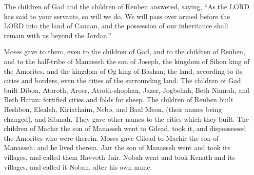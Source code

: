 \myverse{}The children of Gad and the children of Reuben answered, saying,
“As the LORD has said to your servants, so will we do.
\myverse{}We will pass over armed before the LORD into the land of Canaan, and the
possession of our inheritance shall remain with us beyond the Jordan.”


\myverse{}Moses gave to them, even to the children of Gad, and to the
children of Reuben, and to the half-tribe of Manasseh the son of Joseph, the kingdom of Sihon king of
the Amorites, and the kingdom of Og king of Bashan; the land, according to its cities and borders, even
the cities of the surrounding land.
\myverse{}The children of Gad built Dibon, Ataroth, Aroer,
\myverse{}Atroth-shophan, Jazer, Jogbehah,
\myverse{}Beth Nimrah, and Beth Haran: fortified cities and folds for sheep.
\myverse{}The children of Reuben built Heshbon, Elealeh, Kiriathaim,
\myverse{}Nebo, and Baal Meon, (their names being changed), and Sibmah. They gave other
names to the cities which they built.
\myverse{}The children of Machir the son of Manasseh went to Gilead, took it, and dispossessed
the Amorites who were therein.
\myverse{}Moses gave Gilead to Machir the son of Manasseh; and he lived therein.
\myverse{}Jair the son of Manasseh went and took its villages, and called them Havvoth
Jair.
\myverse{}Nobah went and took Kenath and its villages, and called it Nobah, after his
own name.


